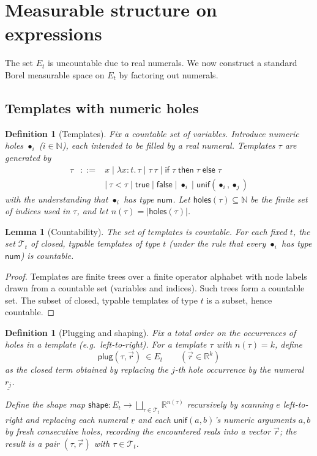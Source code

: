 \documentclass[11pt]{article}
\newtheorem{lemma}[theorem]{Lemma}
\newtheorem{definition}[theorem]{Definition}
\newcommand{\E}[1]{E_{#1}}
\newcommand{\ty}[1]{\mathsf{#1}}
\newcommand{\num}{\ty{num}}
\newcommand{\ul}[1]{\underline{#1}} %
\newcommand{\holes}{\mathsf{holes}}
\newcommand{\N}{\mathbb{N}}
\newcommand{\RR}{\mathbb{R}}
\newcommand{\Tt}{\mathcal{T}}
\newcommand{\plug}{\mathsf{plug}}
\newcommand{\shape}{\mathsf{shape}}
\begin{document}
\section*{Measurable structure on expressions}

The set $\E{t}$ is uncountable due to real numerals. We now construct a standard Borel measurable space on $\E{t}$ by factoring out numerals.

\subsection*{Templates with numeric holes}
\begin{definition}[Templates]
Fix a countable set of variables. Introduce \emph{numeric holes} $\bullet_i$ ($i\in\N$), each intended to be filled by a real numeral.
Templates $\tau$ are generated by
\[
\begin{array}{rcl}
\tau &::=& x \mid \lambda x{:}t.\,\tau \mid \tau\ \tau \mid \ty{if}\;\tau\;\ty{then}\;\tau\;\ty{else}\;\tau \\
&& \mid\ \tau{<}\tau \mid \ty{true}\mid \ty{false}\mid \bullet_i \mid \ty{unif}(\bullet_i,\bullet_j)
\end{array}
\]
with the understanding that $\bullet_i$ has type $\num$.
Let $\holes(\tau)\subseteq\N$ be the finite set of indices used in $\tau$, and let $n(\tau)=|\holes(\tau)|$.
\end{definition}

\begin{lemma}[Countability]\label{lem:countable-templates}
The set of templates is countable. For each fixed $t$, the set $\Tt_t$ of \emph{closed, typable} templates of type $t$ (under the rule that every $\bullet_i$ has type $\num$) is countable.
\end{lemma}
\begin{proof}
Templates are finite trees over a finite operator alphabet with node labels drawn from a countable set (variables and indices). Such trees form a countable set. The subset of closed, typable templates of type $t$ is a subset, hence countable.
\end{proof}

\begin{definition}[Plugging and shaping]\label{def:plug-shape}
Fix a total order on the occurrences of holes in a template (e.g.\ left-to-right). For a template $\tau$ with $n(\tau)=k$, define
\[
\plug(\tau,\vec r)\ \in \E{t}\qquad(\vec r\in \RR^{k})
\]
as the closed term obtained by replacing the $j$-th hole occurrence by the numeral $\ul{r_j}$.

Define the \emph{shape map} $\shape:\E{t}\to \bigsqcup_{\tau\in\Tt_t}\RR^{n(\tau)}$ recursively by scanning $e$ left-to-right and replacing each numeral $\ul r$ and each $\ty{unif}(a,b)$'s numeric arguments $a,b$ by fresh consecutive holes, recording the encountered reals into a vector $\vec r$; the result is a pair $(\tau,\vec r)$ with $\tau\in \Tt_t$.
\end{definition}
\end{document}
